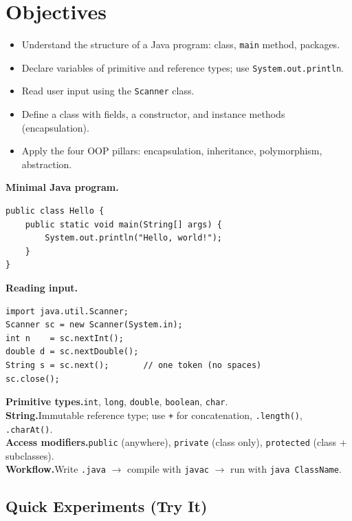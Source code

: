 \documentclass[11pt]{article}
\begin{document}
\labheader

\section*{Objectives}
\begin{itemize}[leftmargin=*,nosep]
  \item Understand the structure of a Java program: class, \texttt{main} method, packages.
  \item Declare variables of primitive and reference types; use \texttt{System.out.println}.
  \item Read user input using the \texttt{Scanner} class.
  \item Define a class with fields, a constructor, and instance methods (encapsulation).
  \item Apply the four OOP pillars: encapsulation, inheritance, polymorphism, abstraction.
\end{itemize}

\begin{summary}
\textbf{Minimal Java program.}
\begin{lstlisting}
public class Hello {
    public static void main(String[] args) {
        System.out.println("Hello, world!");
    }
}
\end{lstlisting}

\textbf{Reading input.}
\begin{lstlisting}
import java.util.Scanner;
Scanner sc = new Scanner(System.in);
int n    = sc.nextInt();
double d = sc.nextDouble();
String s = sc.next();       // one token (no spaces)
sc.close();
\end{lstlisting}

\textbf{Primitive types.}\quad \texttt{int}, \texttt{long}, \texttt{double}, \texttt{boolean}, \texttt{char}.\\
\textbf{String.}\quad Immutable reference type; use \texttt{+} for concatenation, \texttt{.length()}, \texttt{.charAt()}.\\
\textbf{Access modifiers.}\quad \texttt{public} (anywhere), \texttt{private} (class only), \texttt{protected} (class + subclasses).\\
\textbf{Workflow.}\quad Write \texttt{.java} $\to$ compile with \texttt{javac} $\to$ run with \texttt{java ClassName}.
\end{summary}

\subsection*{Quick Experiments (Try It)}
\end{document}

